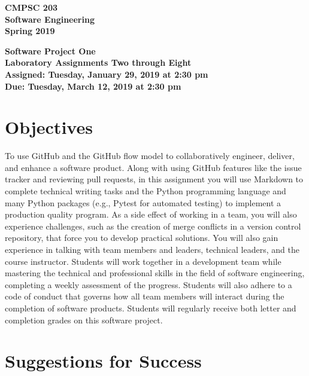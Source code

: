 \documentclass[11pt]{article}
\newcommand{\assignmentduedate}{March 12}
\newcommand{\assignmentassignedate}{January 29}
\newcommand{\assignmentnumber}{One}
\newcommand{\labassignmentnumberstart}{Two}
\newcommand{\labassignmentnumberend}{Eight}
\newcommand{\labyear}{2019}
\newcommand{\labdueday}{Tuesday}
\newcommand{\labassignday}{Tuesday}
\newcommand{\labtime}{2:30 pm}
\newcommand{\assigneddate}{Assigned: \labassignday, \assignmentassignedate, \labyear{} at \labtime{}}
\newcommand{\duedate}{Due: \labdueday, \assignmentduedate, \labyear{} at \labtime{}}
\newcommand{\labtitle}[1]
{
  \begin{center}
    \begin{center}
      \bf
      CMPSC 203\\Software Engineering\\
      Spring 2019\\
      \medskip
    \end{center}
    \bf
    #1
  \end{center}
}
\begin{document}
\thispagestyle{empty}

\labtitle{Software Project \assignmentnumber{} \\ Laboratory Assignments \labassignmentnumberstart{} through \labassignmentnumberend{} \\ \assigneddate{} \\ \duedate{}}

\section*{Objectives}

To use GitHub and the GitHub flow model to collaboratively engineer, deliver,
and enhance a software product.
%
Along with using GitHub features like the issue tracker and reviewing pull
requests, in this assignment you will use Markdown to complete technical writing
tasks and the Python programming language and many Python packages (e.g., Pytest
for automated testing) to implement a production quality program.
%
As a side effect of working in a team, you will also experience challenges, such
as the creation of merge conflicts in a version control repository, that force
you to develop practical solutions.
%
You will also gain experience in talking with team members and leaders,
technical leaders, and the course instructor.
%
Students will work together in a development team while mastering the technical
and professional skills in the field of software engineering, completing a
weekly assessment of the progress.
%
Students will also adhere to a code of conduct that governs how all team members
will interact during the completion of software products.
%
Students will regularly receive both letter and completion grades on this
software project.

\section*{Suggestions for Success}
\end{document}
